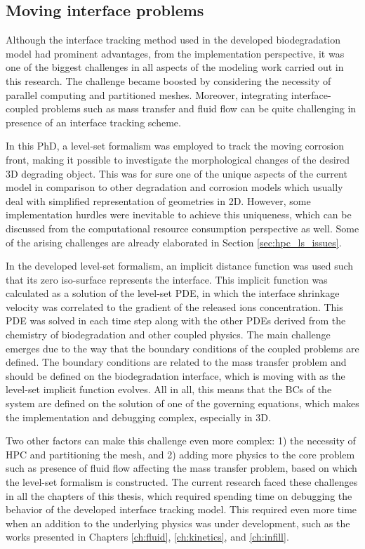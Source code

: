 \subsection{Moving interface problems}

Although the interface tracking method used in the developed biodegradation model had prominent advantages, from the implementation perspective, it was one of the biggest challenges in all aspects of the modeling work carried out in this research. The challenge became boosted by considering the necessity of parallel computing and partitioned meshes. Moreover, integrating interface-coupled problems such as mass transfer and fluid flow can be quite challenging in presence of an interface tracking scheme. 

In this PhD, a level-set formalism was employed to track the moving corrosion front, making it possible to investigate the morphological changes of the desired 3D degrading object. This was for sure one of the unique aspects of the current model in comparison to other degradation and corrosion models which usually deal with simplified representation of geometries in 2D. However, some implementation hurdles were inevitable to achieve this uniqueness, which can be discussed from the computational resource consumption perspective as well. Some of the arising challenges are already elaborated in Section \ref{sec:hpc_ls_issues}.

In the developed level-set formalism, an implicit distance function was used such that its zero iso-surface represents the interface. This implicit function was calculated as a solution of the level-set PDE, in which the interface shrinkage velocity was correlated to the gradient of the released ions concentration. This PDE was solved in each time step along with the other PDEs derived from the chemistry of biodegradation and other coupled physics. The main challenge emerges due to the way that the boundary conditions of the coupled problems are defined. The boundary conditions are related to the mass transfer problem and should be defined on the biodegradation interface, which is moving with as the level-set implicit function evolves. All in all, this means that the BCs of the system are defined on the solution of one of the governing equations, which makes the implementation and debugging complex, especially in 3D. 

Two other factors can make this challenge even more complex: 1) the necessity of HPC and partitioning the mesh, and 2) adding more physics to the core problem such as presence of fluid flow affecting the mass transfer problem, based on which the level-set formalism is constructed. The current research faced these challenges in all the chapters of this thesis, which required spending time on debugging the behavior of the developed interface tracking model. This required even more time when an addition to the underlying physics was under development, such as the works presented in Chapters \ref{ch:fluid}, \ref{ch:kinetics}, and \ref{ch:infill}.


